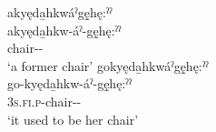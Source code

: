 \ex akyęda̱hkwáˀgę̱hę:ˀˀ\\
\gll akyęda̱hkw-áˀ-gę̱hę:ˀˀ\\
 chair-{\joinerA}-{\past}\\
\glt `a former chair'
\ex gokyęda̱hkwáˀgę̱hę:ˀˀ\\
\gll go-kyęda̱hkw-áˀ-gę̱hę:ˀˀ\\
 \textsc{3s.fi.p}-chair-{\joinerA}-{\past}\\
\glt `it used to be her chair'
\z
\z

